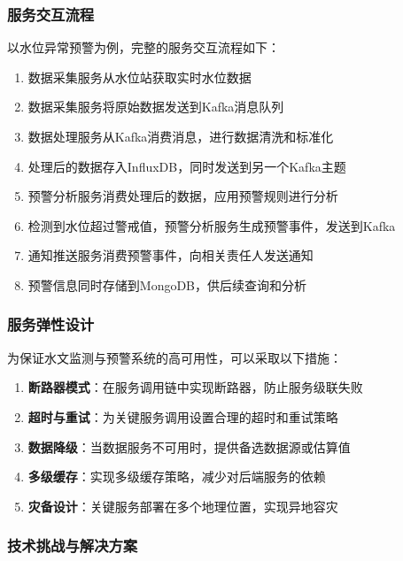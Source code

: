 \subsubsection{服务交互流程}\label{ux670dux52a1ux4ea4ux4e92ux6d41ux7a0b}

以水位异常预警为例，完整的服务交互流程如下：

\begin{enumerate}
\def\labelenumi{\arabic{enumi}.}
\tightlist
\item
  数据采集服务从水位站获取实时水位数据
\item
  数据采集服务将原始数据发送到Kafka消息队列
\item
  数据处理服务从Kafka消费消息，进行数据清洗和标准化
\item
  处理后的数据存入InfluxDB，同时发送到另一个Kafka主题
\item
  预警分析服务消费处理后的数据，应用预警规则进行分析
\item
  检测到水位超过警戒值，预警分析服务生成预警事件，发送到Kafka
\item
  通知推送服务消费预警事件，向相关责任人发送通知
\item
  预警信息同时存储到MongoDB，供后续查询和分析
\end{enumerate}

\subsubsection{服务弹性设计}\label{ux670dux52a1ux5f39ux6027ux8bbeux8ba1}

为保证水文监测与预警系统的高可用性，可以采取以下措施：

\begin{enumerate}
\def\labelenumi{\arabic{enumi}.}
\tightlist
\item
  \textbf{断路器模式}：在服务调用链中实现断路器，防止服务级联失败
\item
  \textbf{超时与重试}：为关键服务调用设置合理的超时和重试策略
\item
  \textbf{数据降级}：当数据服务不可用时，提供备选数据源或估算值
\item
  \textbf{多级缓存}：实现多级缓存策略，减少对后端服务的依赖
\item
  \textbf{灾备设计}：关键服务部署在多个地理位置，实现异地容灾
\end{enumerate}

\subsubsection{技术挑战与解决方案}\label{ux6280ux672fux6311ux6218ux4e0eux89e3ux51b3ux65b9ux6848}

